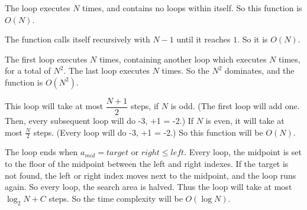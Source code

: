 \documentclass[12pt]{exam}
\begin{document}
\begin{qparts}
    \item \begin{algorithmic}
                    \State{}
                \EndIf
                    \State{}
                \EndIf
                \EndIf
                \EndIf
            \EndWhile
        \EndFunction
    \end{algorithmic}
\end{qparts}

\begin{solution}
    \begin{qparts}
        \item The loop executes $N$ times, and contains no loops within itself. So this function is $O(N)$.
        \item The function calls itself recursively with $N-1$ until it reaches $1$. So it is $O(N)$.
        \item The first loop executes $N$ times, containing another loop which executes $N$ times, for a total of $N^2$. The last loop executes $N$ times. So the $N^2$ dominates, and the function is $O(N^2)$.
        \item This loop will take at most $\dfrac{N+1}2$ steps, if $N$ is odd. (The first loop will add one. Then, every subsequent loop will do -3, +1 = -2.) If $N$ is even, it will take at most $\frac{N}2$ steps. (Every loop will do -3, +1 = -2.) So this function will be $O(N)$.
        \item The loop ends when $a_{mid} = target$ or $right \leq left$. Every loop, the midpoint is set to the floor of the midpoint between the left and right indexes. If the target is not found, the left or right index moves next to the midpoint, and the loop runs again. So every loop, the search area is halved. Thus the loop will take at most $\log_2 N + C$ steps. So the time complexity will be $O(\log N)$.
    \end{qparts}
\end{solution}
\end{document}
